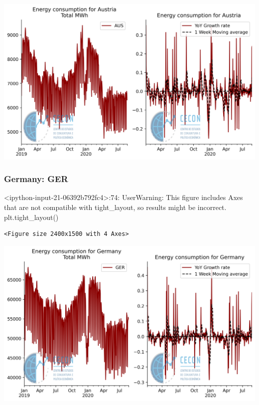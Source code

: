 \documentclass[11pt]{article}
\begin{document}
\begin{center}
\includegraphics[width=.9\linewidth]{obipy-resources/62e383af79e91b63c7fc98dd7fb55b3c3ececcb9/9ef112a5872cc34e81a6bb8ef5d1a8c7b5fddf8e.png}
\end{center}

\subsubsection{Germany: GER}
\label{sec:org43bc300}

<ipython-input-21-06392b792fc4>:74: UserWarning: This figure includes Axes that are not compatible with tight\_layout, so results might be incorrect.
  plt.tight\_layout()

\begin{verbatim}
<Figure size 2400x1500 with 4 Axes>
\end{verbatim}


\begin{center}
\includegraphics[width=.9\linewidth]{obipy-resources/62e383af79e91b63c7fc98dd7fb55b3c3ececcb9/94b114813ade8f5d4312e2e75f5b997a956c4a44.png}
\end{center}
\end{document}
